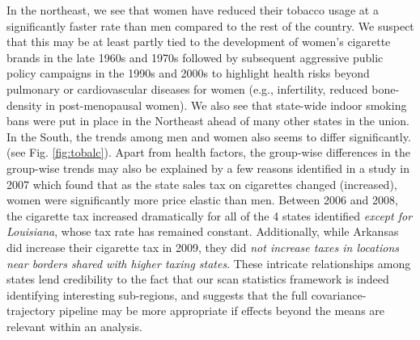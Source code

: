 In the northeast, we see that women have reduced their tobacco usage at a significantly faster rate than men compared to the rest of the country. 
We suspect that this may be at least partly tied to the development of women's cigarette brands in the late 1960s and 1970s 
followed by subsequent aggressive public policy campaigns in the 1990s and 2000s to highlight health risks beyond 
pulmonary or cardiovascular diseases for women (e.g., infertility, reduced bone-density in post-menopausal women). We also see that 
state-wide indoor smoking bans were put in place in the Northeast 
ahead of many other states in the union.  
In the South, the trends among men and women also seems to differ significantly. (see Fig. \ref{fig:tobalc}). 
Apart from health factors, the group-wise differences in the group-wise trends may also be explained by 
a few reasons identified in a study in 2007 \cite{HEC:HEC1223} which found that as the state sales tax on cigarettes changed (increased), 
women were significantly more price elastic than men. Between 2006 and 2008, the cigarette tax increased dramatically for all of the 4 states identified \textit{except for Louisiana}, whose tax rate has remained constant. Additionally, while Arkansas did increase their cigarette tax in 2009, they did \textit{not increase taxes in locations near borders shared with higher taxing states}. These intricate relationships among states lend credibility to the fact that our scan statistics framework is indeed identifying interesting sub-regions, and suggests that the full covariance-trajectory pipeline may be more appropriate if effects beyond the means are relevant within an analysis. 

%
